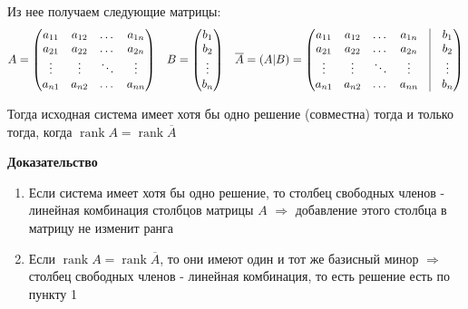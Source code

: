 \documentclass[class=article,a4paper,12pt,crop=false]{standalone}
\DeclareMathOperator{\rank}{rank}
\begin{document}
Из нее получаем следующие матрицы:
\begin{equation}
    \begin{aligned}
        A = \begin{pmatrix}
            a_{11} & a_{12} & \dots & a_{1n} \\
            a_{21} & a_{22} & \dots & a_{2n} \\
            \vdots & \vdots & \ddots & \vdots \\
            a_{n1} & a_{n2} & \dots & a_{nn}
        \end{pmatrix} & & B = \begin{pmatrix}
            b_1 \\ b_2 \\ \vdots \\ b_n
        \end{pmatrix} & &
        \overline{A} = (A | B) = \begin{pmatrix}
            a_{11} & a_{12} & \dots & a_{1n} & \vrule & b_1 \\
            a_{21} & a_{22} & \dots & a_{2n} & \vrule & b_2 \\
            \vdots & \vdots & \ddots & \vdots & \vrule & \vdots \\
            a_{n1} & a_{n2} & \dots & a_{nn} & \vrule & b_n
        \end{pmatrix}
    \end{aligned}
\end{equation}

Тогда исходная система имеет хотя бы одно решение (совместна) тогда и только тогда, когда $\rank{A} = \rank{\overline{A}}$

\textbf{Доказательство}

\begin{enumerate}
    \item {
        Если система имеет хотя бы одно решение, то столбец свободных членов - линейная комбинация
        столбцов матрицы $A$ $\Rightarrow$ добавление этого столбца в матрицу не изменит ранга
    }
    \item {
        Если $\rank{A} = \rank{\overline{A}}$, то они имеют один и тот же базисный минор $\Rightarrow$
        столбец свободных членов - линейная комбинация, то есть решение есть по пункту 1
    }
\end{enumerate}
\end{document}
